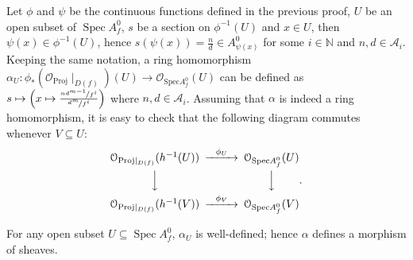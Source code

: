 \documentclass[a4paper,UKenglish,cleveref, autoref, thm-restate]{lipics-v2021}
\begin{document}
Let $\phi$ and $\psi$ be the continuous functions defined in the previous proof, $U$ be an open subset of $\operatorname{Spec}A^0_f$, $s$ be a section on $\phi^{-1}(U)$ and $x \in U$, then $\psi(x)\in \phi^{-1}(U)$, hence $s(\psi(x))=\frac n d\in A^0_{\psi(x)}$ for some $i\in\mathbb{N}$ and $n, d \in \mathcal{A}_i$. Keeping the same notation, a ring homomorphism $\alpha_U:\phi_*(\mathcal O_{\mathrm{Proj}}\!\mid_{D(f)})(U)\to \mathcal O_{\mathrm{Spec}A^0_f}(U)$ can be defined as $s\mapsto \left(x\mapsto \frac{\nicefrac{nd^{m-1}}{f^i}}{\nicefrac{d^m}{f^i}}\right)$ where $n, d\in\mathcal{A}_i$.  Assuming that $\alpha$ is indeed a ring homomorphism, it is easy to check that the following diagram commutes whenever $V\subseteq U$:
$$
\begin{CD} 
    \mathcal O_{\mathrm{Proj}\mid_{D(f)}}(h^{-1}(U)) @>{\phi_U}>> \mathcal O_{\mathrm{Spec}A^0_f}(U) \\
    @VVV                                                           @VVV                              \\
    \mathcal O_{\mathrm{Proj}\mid_{D(f)}}(h^{-1}(V)) @>{\phi_V}>> \mathcal O_{\mathrm{Spec}A^0_f}(V)
\end{CD}.
$$
\begin{lemma}\label{thm:def-alpha}
    For any open subset $U\subseteq \operatorname{Spec}A^0_f$, $\alpha_U$ is well-defined; hence $\alpha$ defines a morphism of sheaves.
\end{lemma}
\end{document}
